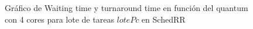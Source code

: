 \begin{figure}[H]
\hfill
{}
\hfill
{}
\hfill
\caption{Gráfico de Waiting time y turnaround time en función del quantum con 4 cores para lote de tareas $lotePc$ en SchedRR}
\end{figure}

